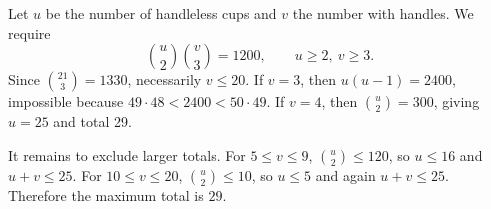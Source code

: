 Let $u$ be the number of handleless cups and $v$ the number with handles. We require
\[\binom u2\binom v3=1200,\qquad u\ge2,\ v\ge3.\]
Since $\binom{21}{3}=1330$, necessarily $v\le20$. If $v=3$, then $u(u-1)=2400$, impossible because $49\cdot48<2400<50\cdot49$. If $v=4$, then $\binom u2=300$, giving $u=25$ and total 29.

It remains to exclude larger totals. For $5\le v\le9$, $\binom u2\le120$, so $u\le16$ and $u+v\le25$. For $10\le v\le20$, $\binom u2\le10$, so $u\le5$ and again $u+v\le25$. Therefore the maximum total is $\boxed{29}$.
